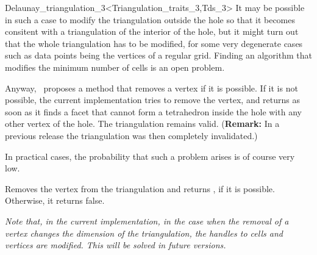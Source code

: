 \begin{ccRefClass}{Delaunay_triangulation_3<Triangulation_traits_3,Tds_3>}
It may be possible in such a case to modify the triangulation outside
the hole so that it becomes consitent with a triangulation of the
interior of the hole, but it might turn out that the whole
triangulation has to be modified, for some very degenerate cases such
as data points being the vertices of a regular grid. Finding an
algorithm that modifies the minimum number of cells is an open problem.

Anyway, \cgal\ proposes a method that removes a vertex if it is
possible. If it is not possible, the current implementation tries to
remove the vertex, and returns  as soon as it finds a facet
that cannot form a tetrahedron inside the hole with any other vertex
of the hole. The triangulation remains valid. ({\bf Remark:} In a previous 
release the triangulation was then completely invalidated.) 

In practical cases, the probability that such a problem arises is
of course very low.

{Removes the vertex  from the triangulation and returns
, if it is possible. Otherwise, it returns false.
}

\textit{Note that, in the current implementation, in the case when the
removal of a vertex changes the dimension of the triangulation, the
handles to cells and vertices are modified. This will be solved in
future versions.} 



\end{ccRefClass}

